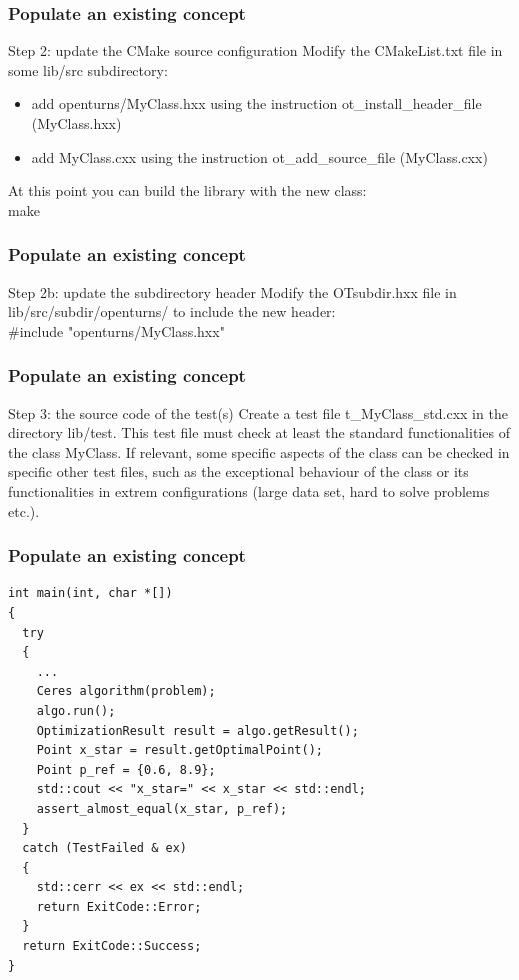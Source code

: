 \documentclass[8pt]{beamer}
\begin{document}
\begin{frame}
  \frametitle{Populate an existing concept}
  \begin{block}{Step 2: update the CMake source configuration}
    Modify the CMakeList.txt file in some lib/src subdirectory:
    \begin{itemize}
    \item add openturns/MyClass.hxx using the instruction {\ttfamily ot\_install\_header\_file (MyClass.hxx)}
    \item add MyClass.cxx using the instruction {\ttfamily ot\_add\_source\_file (MyClass.cxx)}
    \end{itemize}
    At this point you can build the library with the new class:\\
     {\ttfamily make}
  \end{block}
\end{frame}
\begin{frame}
  \frametitle{Populate an existing concept}
  \begin{block}{Step 2b: update the subdirectory header}
    Modify the OTsubdir.hxx file in lib/src/subdir/openturns/ to include the new header:\\
    {\ttfamily \#include "openturns/MyClass.hxx"}

  \end{block}
\end{frame}
\begin{frame}
  \frametitle{Populate an existing concept}
  \begin{block}{Step 3: the source code of the test(s)}
    Create a test file t\_MyClass\_std.cxx in the directory lib/test. This test file must check at least the standard functionalities of the class MyClass. If relevant, some specific aspects of the class can be checked in specific other test files, such as the exceptional behaviour of the class or its functionalities in extrem configurations (large data set, hard to solve problems etc.).
  \end{block}
\end{frame}

\begin{frame}[fragile]
  \frametitle{Populate an existing concept}
  \lstset{style=mystyle}
  
\begin{lstlisting}
int main(int, char *[])
{
  try
  {
    ...
    Ceres algorithm(problem);
    algo.run();
    OptimizationResult result = algo.getResult();
    Point x_star = result.getOptimalPoint();
    Point p_ref = {0.6, 8.9};
    std::cout << "x_star=" << x_star << std::endl;
    assert_almost_equal(x_star, p_ref);
  }
  catch (TestFailed & ex)
  {
    std::cerr << ex << std::endl;
    return ExitCode::Error;
  }
  return ExitCode::Success;
}
\end{lstlisting}
\end{frame}
\end{document}
